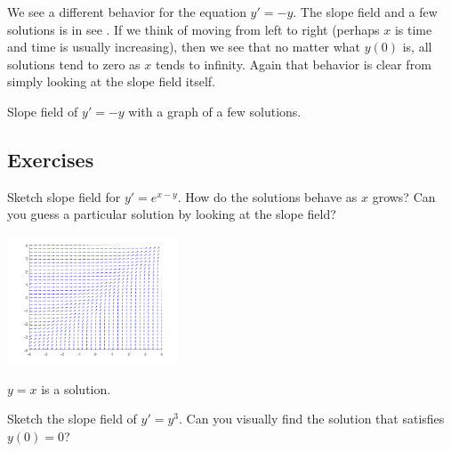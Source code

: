 We see a different behavior for the equation
$y' = -y$.  The slope field and a few solutions is in
see .
If we think of moving from left to right (perhaps $x$ is time
and time is usually increasing), then
we see that no matter what $y(0)$ is, all solutions tend to zero as $x$
tends to infinity.
Again that behavior is clear from simply
looking at the slope field itself.

\begin{myfig}
\capstart
{}
\caption{Slope field of $y' = -y$ with a graph of a few solutions.\label{1.3:fig3}}
\end{myfig}

\subsection{Exercises}

\begin{exercise}
Sketch slope field for $y'=e^{x-y}$.  How do the solutions behave as $x$
grows?  Can you guess a particular solution by looking at the slope
field?
\end{exercise}
\comboSol{%
}
{%
\includegraphics[width=2in]{Images/slopefieldexpxmy.png}

$y=x$ is a solution.
}

\begin{exercise}\ansMark%
Sketch the slope field of $y'=y^3$.  Can you visually find the solution
that satisfies $y(0)=0$?
\end{exercise}


